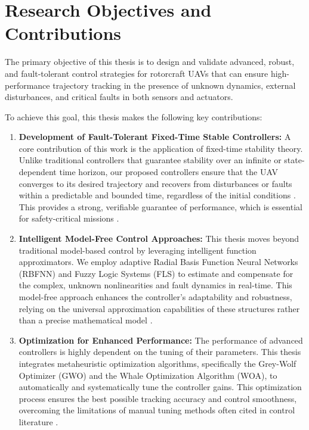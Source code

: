 \section{Research Objectives and Contributions}
\label{sec:intro_objectives}

The primary objective of this thesis is to design and validate advanced, robust, and fault-tolerant control strategies for rotorcraft UAVs that can ensure high-performance trajectory tracking in the presence of unknown dynamics, external disturbances, and critical faults in both sensors and actuators.

\noindent To achieve this goal, this thesis makes the following key contributions:

\begin{enumerate}
    \item \textbf{Development of Fault-Tolerant Fixed-Time Stable Controllers:} A core contribution of this work is the application of fixed-time stability theory. Unlike traditional controllers that guarantee stability over an infinite or state-dependent time horizon, our proposed controllers ensure that the UAV converges to its desired trajectory and recovers from disturbances or faults within a predictable and bounded time, regardless of the initial conditions \cite{Polyakov2012}. This provides a strong, verifiable guarantee of performance, which is essential for safety-critical missions \cite{Ni2016}.

    \item \textbf{Intelligent Model-Free Control Approaches:} This thesis moves beyond traditional model-based control by leveraging intelligent function approximators. We employ adaptive Radial Basis Function Neural Networks (RBFNN) and Fuzzy Logic Systems (FLS) to estimate and compensate for the complex, unknown nonlinearities and fault dynamics in real-time. This model-free approach enhances the controller's adaptability and robustness, relying on the universal approximation capabilities of these structures rather than a precise mathematical model \cite{Park1991, Wang1994}.

    \item \textbf{Optimization for Enhanced Performance:} The performance of advanced controllers is highly dependent on the tuning of their parameters. This thesis integrates metaheuristic optimization algorithms, specifically the Grey-Wolf Optimizer (GWO) and the Whale Optimization Algorithm (WOA), to automatically and systematically tune the controller gains. This optimization process ensures the best possible tracking accuracy and control smoothness, overcoming the limitations of manual tuning methods often cited in control literature \cite{Precup2015, Eltogby2016}.
\end{enumerate}%
